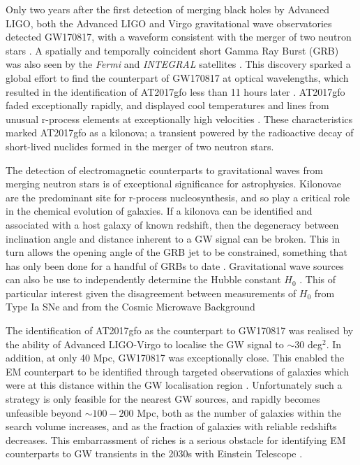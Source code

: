 \documentclass{aa}
\begin{document}
Only two years after the first detection of merging black holes by Advanced LIGO, both the Advanced LIGO and Virgo gravitational wave observatories detected GW170817, with a waveform consistent with the merger of two neutron stars \citep{GW170817}. A spatially and temporally coincident short Gamma Ray Burst (GRB) was also seen by the {\it Fermi} and {\it INTEGRAL} satellites \citep{GW170817_GRB}. This discovery sparked a global effort to find the counterpart of GW170817 at optical wavelengths, which resulted in the identification of AT2017gfo less than 11 hours later \citep{GW170817_EM}. AT2017gfo faded exceptionally rapidly, and displayed cool temperatures and lines from unusual r-process elements at exceptionally high velocities \citep{Smar17,Arca17,Pian17,Coul17,Kilp17}. These characteristics marked AT2017gfo as a kilonova; a transient powered by the radioactive decay of short-lived nuclides formed in the merger of two neutron stars.

The detection of electromagnetic counterparts to gravitational waves from merging neutron stars is of exceptional significance for astrophysics. Kilonovae are the predominant site for r-process nucleosynthesis, and so play a critical role in the chemical evolution of galaxies. If a kilonova can be identified and associated with a host galaxy of known redshift, then the degeneracy between inclination angle and distance inherent to a GW signal can be broken. This in turn allows the opening angle of the GRB jet to be constrained, something that has only been done for a handful of GRBs to date \citep{2018ApJ...857..128J}. Gravitational wave sources can also be use to independently determine the Hubble constant $H_0$ \citep{GWH0}. This of particular interest given the disagreement between measurements of $H_0$ from Type Ia SNe and from the Cosmic Microwave Background \citep[e.g.][]{Bern16}

The identification of AT2017gfo as the counterpart to GW170817 was realised by the 
ability of Advanced LIGO-Virgo to localise the GW signal to $\sim$30 deg$^2$.
In addition, at only 40 Mpc, GW170817 was exceptionally close. This enabled the EM counterpart to be identified through targeted observations of galaxies which were at this distance within the GW localisation region \citep{Coul17}. Unfortunately such a strategy is only feasible for the nearest GW sources, and rapidly becomes unfeasible beyond $\sim100-200$ Mpc, both as the number of galaxies within the search volume increases, and as the fraction of galaxies with reliable redshifts decreases. 
This embarrassment of riches is a serious obstacle for identifying EM counterparts to GW transients in the 2030s with Einstein Telescope \citep{ET_doc}.
\end{document}
